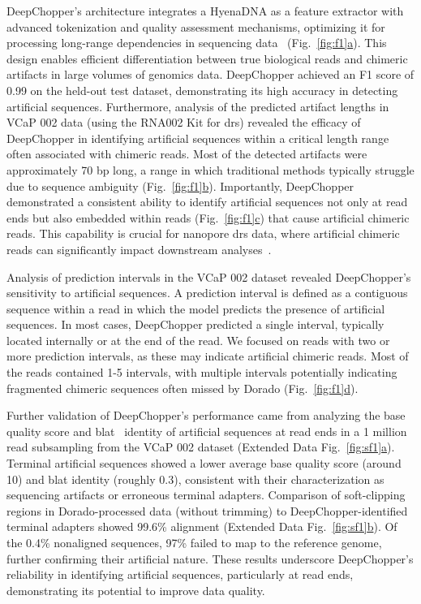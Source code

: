 \documentclass[pdflatex, sn-mathphys-num, lineno]{sn-jnl}%
\newcommand{\figref}[2]{Fig.~\hyperref[#1]{\ref*{#1}#2}}
\newcommand{\edfigref}[2]{Extended Data Fig.~\hyperref[#1]{\ref*{#1}#2}}
\theoremstyle{thmstyleone}%
\theoremstyle{thmstyletwo}%
\theoremstyle{thmstylethree}%
\begin{document}
DeepChopper's architecture integrates a HyenaDNA as a feature extractor with advanced tokenization and quality assessment mechanisms, optimizing it for processing long-range dependencies in sequencing data~\cite{nguyen2024hyenadna} (\figref{fig:f1}{a}).
This design enables efficient differentiation between true biological reads and chimeric artifacts in large volumes of genomics data.
DeepChopper achieved an F1 score of 0.99 on the held-out test dataset, demonstrating its high accuracy in detecting artificial sequences.
Furthermore, analysis of the predicted artifact lengths in VCaP 002 data (using the RNA002 Kit for \gls{drs}) revealed the efficacy of DeepChopper in identifying artificial sequences within a critical length range often associated with chimeric reads.
Most of the detected artifacts were approximately 70 bp long, a range in which traditional methods typically struggle due to sequence ambiguity (\figref{fig:f1}{b}).
Importantly, DeepChopper demonstrated a consistent ability to identify artificial sequences not only at read ends but also embedded within reads (\figref{fig:f1}{c}) that cause artificial chimeric reads.
This capability is crucial for nanopore \gls{drs} data, where artificial chimeric reads can significantly impact downstream analyses~\cite{smith2020molecular}.

Analysis of prediction intervals in the VCaP 002 dataset revealed DeepChopper's sensitivity to artificial sequences.
A prediction interval is defined as a contiguous sequence within a read in which the model predicts the presence of artificial sequences.
In most cases, DeepChopper predicted a single interval, typically located internally or at the end of the read.
We focused on reads with two or more prediction intervals, as these may indicate artificial chimeric reads.
Most of the reads contained 1-5 intervals, with multiple intervals potentially indicating fragmented chimeric sequences often missed by Dorado (\figref{fig:f1}{d}).

Further validation of DeepChopper's performance came from analyzing the base quality score and \gls{blat}~\cite{kent2002blat} identity of artificial sequences at read ends in a 1 million read subsampling from the VCaP 002 dataset (\edfigref{fig:sf1}{a}).
Terminal artificial sequences showed a lower average base quality score (around 10) and \gls{blat} identity (roughly 0.3), consistent with their characterization as sequencing artifacts or erroneous terminal adapters.
Comparison of soft-clipping regions in Dorado-processed data (without trimming) to DeepChopper-identified terminal adapters showed 99.6\% alignment (\edfigref{fig:sf1}{b}).
Of the 0.4\% nonaligned sequences, 97\% failed to map to the reference genome, further confirming their artificial nature.
These results underscore DeepChopper's reliability in identifying artificial sequences, particularly at read ends, demonstrating its potential to improve data quality.
\end{document}
